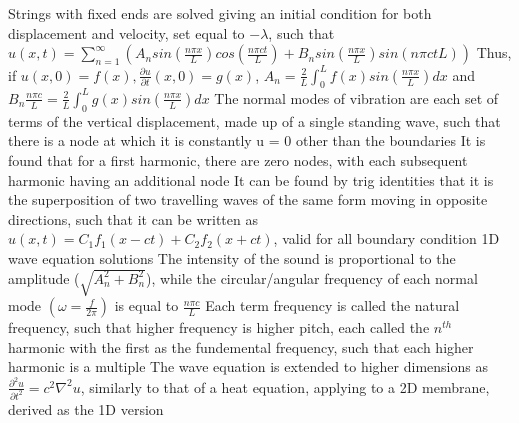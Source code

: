 \documentclass[11 pt, twoside]{article}
\newenvironment{outline*}
{
	\begin{outline}[enumerate]
	}
	{\end{outline}
}
\newcommand\pd[2]{\frac{\partial #1}{\partial #2}}
\begin{document}
\begin{outline*}
\1 Strings with fixed ends are solved giving an initial condition for both displacement and velocity, set equal to $-\lambda$, such that $u(x, t) = \sum^{\infty}_{n = 1}(A_nsin(\frac{n\pi x}{L})cos(\frac{n\pi ct}{L}) + B_nsin(\frac{n\pi x}{L})sin({n \pi ct}{L}))$
	\2 Thus, if $u(x, 0) = f(x), \frac{\partial u}{\partial t}(x, 0) = g(x)$, $A_n = \frac{2}{L}\int^L_0 f(x)sin(\frac{n\pi x}{L})dx$ and $B_n\frac{n\pi c}{L} = \frac{2}{L}\int^L_0 g(x)sin(\frac{n\pi x}{L})dx$
	\2 The normal modes of vibration are each set of terms of the vertical displacement, made up of a single standing wave, such that there is a node at which it is constantly u = 0 other than the boundaries
		\3 It is found that for a first harmonic, there are zero nodes, with each subsequent harmonic having an additional node
		\3 It can be found by trig identities that it is the superposition of two travelling waves of the same form moving in opposite directions, such that it can be written as $u(x, t) = C_1f_1(x - ct) + C_2f_2(x + ct)$, valid for all boundary condition 1D wave equation solutions
	\2 The intensity of the sound is proportional to the amplitude ($\sqrt{A_n^2 + B_n^2}$), while the circular/angular frequency of each normal mode $(\omega = \frac{f}{2\pi})$ is equal to $\frac{n\pi c}{L}$
		\3 Each term frequency is called the natural frequency, such that higher frequency is higher pitch, each called the $n^{th}$ harmonic with the first as the fundemental frequency, such that each higher harmonic is a multiple
\1 The wave equation is extended to higher dimensions as $\pd{^2u}{t^2} = c^2\nabla^2u$, similarly to that of a heat equation, applying to a 2D membrane, derived as the 1D version
\end{outline*}
\end{document}

